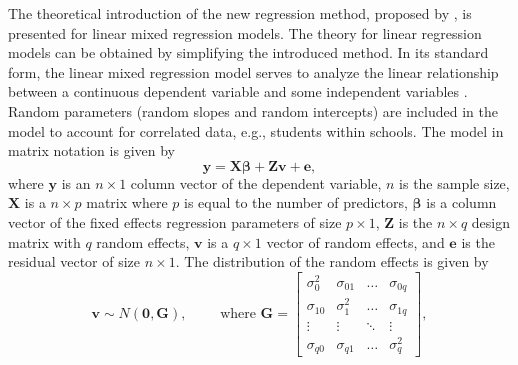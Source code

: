 The theoretical introduction of the new regression method, proposed by \citet{Wal19}, is presented for linear mixed  regression models. The theory for linear regression models can be obtained by simplifying the introduced method. In its standard form, the linear mixed regression model serves to analyze the linear relationship between a continuous dependent variable and some independent variables \citep{Gol03}. Random parameters (random slopes and random intercepts) are included in the model to account for correlated data, e.g., students within schools.  The model in matrix notation \citep{Lai83} is given by
\begin{equation}
\label{Eq:NestedErrorModelR}
\mathbf{y}=\mathbf{X}\boldsymbol{\beta}+\mathbf{Z}\mathbf{v}+\mathbf{e},
\end{equation}
where \(\mathbf{y}\) is an \(n \times 1\) column vector of the dependent variable, \(n\) is the sample size, \(\mathbf{X}\) is a \(n \times p\) matrix where \(p\) is equal to the number of predictors, \(\boldsymbol{\beta}\) is a column vector of the fixed effects regression parameters of size \(p \times 1\), \(\mathbf{Z}\) is the \(n\times q\) design matrix with \(q\) random effects, \(\mathbf{v}\) is a \(q \times 1\) vector of random effects, and \(\mathbf{e}\) is the residual vector of size \(n\times 1\). The distribution of the random effects is given by
\begin{equation*}
\mathbf{v}\sim N\left(\mathbf{0}, \mathbf{G}\right), \qquad \text{ where } \mathbf{G}=\begin{bmatrix}
\sigma_{0}^{2}	& \sigma_{01}	& \dots	 & \sigma_{0q}      \\
\sigma_{10}	& \sigma_{1}^{2} 	& \dots  & \sigma_{1q} 	  \\
\vdots	& \vdots 	& \ddots & \vdots \\
\sigma_{q0} 	& \sigma_{q1} & \dots	 & \sigma_{q}^{2}
\end{bmatrix},
\end{equation*}
